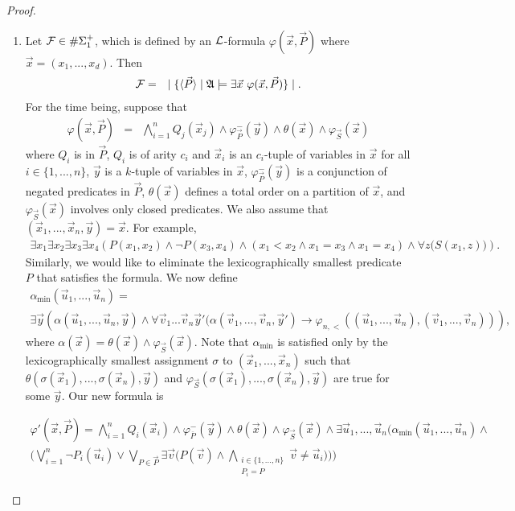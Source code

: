 \documentclass[12pt]{article}
\def\A{{\frak A}}
\def\L{{\cal L}}
\def\F{{\cal F}}
\def\P{\vec{P}}
\def\S{\vec{S}}
\def\u{\vec{u}}
\def\v{\vec{v}}
\def\x{\vec{x}}
\def\y{\vec{y}}
\begin{document}
\begin{proof}
\begin{enumerate}
\item Let $\F \in \#\Sigma_1^+$, which is defined by an $\L$-formula $\varphi(\x,\P)$ where $\x = (x_1,...,x_d)$. Then
\begin{eqnarray*}
\F &=& \mid \{ \langle\P\rangle \mid \A \models \exists \x \ \varphi(\x,\P) \} \mid.
\end{eqnarray*}
For the time being, suppose that
\begin{eqnarray*}
\varphi(\x,\P) &=& \bigwedge_{i=1}^n Q_j(\x_j) \wedge \varphi_{\P}^{-}(\y) \wedge \theta(\x) \wedge \varphi_{\S}(\x)
\end{eqnarray*}
where $Q_i$ is in $\P$, $Q_i$ is of arity $c_i$ and $\x_i$ is an $c_i$-tuple of variables in $\x$ for all $i \in \{1,...,n\}$, $\y$ is a $k$-tuple of variables in $\x$, $\varphi_{\P}^{-}(\y)$ is a conjunction of negated predicates in $\P$, $\theta(\x)$ defines a total order on a partition of $\x$, and $\varphi_{\S}(\x)$ involves only closed predicates. We also assume that $(\x_1,...,\x_n,\y) = \x$. For example,
\begin{eqnarray*}
\exists x_1\exists x_2\exists x_3\exists x_4 \left( P(x_1,x_2) \wedge \neg P(x_3,x_4) \wedge (x_1 < x_2 \wedge x_1 = x_3 \wedge x_1 = x_4 ) \wedge \forall z\big( S(x_1,z) \big) \right).
\end{eqnarray*}
Similarly, we would like to eliminate the lexicographically smallest predicate $P$ that satisfies the formula. We now define
\begin{multline*}
\alpha_{\min}(\u_1,...,\u_n) = \\ \exists\y\left( \alpha(\u_1,...,\u_n,\y)\wedge \forall\v_1...\v_n\y\prime(\alpha(\v_1,...,\v_n,\y\prime)\rightarrow \varphi_{n,<}((\u_1,...,\u_n),(\v_1,...,\v_n))\right),
\end{multline*}
where $\alpha(\x) = \theta(\x) \wedge \varphi_{\S}(\x)$. Note that $\alpha_{\min}$ is satisfied only by the lexicographically smallest assignment $\sigma$ to $(\x_1,...,\x_n)$ such that $\theta(\sigma(\x_1),...,\sigma(\x_n),\y)$ and $\varphi_{\S}(\sigma(\x_1),...,\sigma(\x_n),\y)$ are true for some $\y$. Our new formula is

\begin{multline*}
\varphi\prime(\x,\P) = \bigwedge_{i=1}^n Q_i(\x_i) \wedge \varphi^{-}_{\overline{P}}(\y) \wedge \theta(\x) \wedge \varphi_{\S}(\x)\wedge\exists\u_1,...,\u_n\Bigg(\alpha_{\min}(\u_1,...,\u_n) \wedge \\ \bigg(\bigvee_{i = 1}^{n}\neg P_i(\u_i) \vee \bigvee_{P\in\P} \exists \v\Big( P(\v) \wedge \bigwedge_{\substack{i\in\{1,...,n\} \\ P_i = P}} \v \neq \u_i\Big) \bigg) \Bigg)
\end{multline*}


\end{enumerate}
\end{proof}
\end{document}
